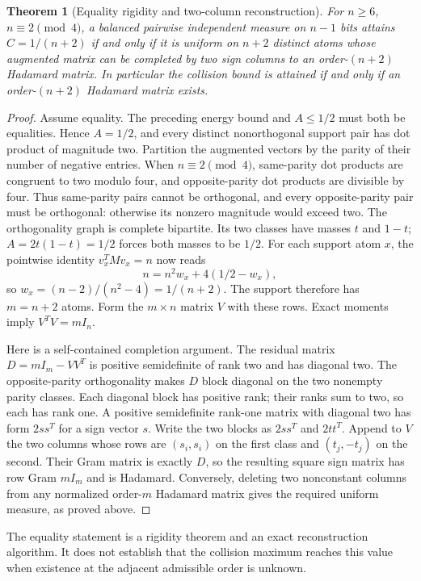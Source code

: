 \documentclass[11pt]{article}
\newtheorem{theorem}{Theorem}[section]
\begin{document}
\begin{theorem}[Equality rigidity and two-column reconstruction]
\label{thm:discrete-parity-equality}
For $n\ge6$, $n\equiv2\pmod4$, a balanced pairwise independent measure
on $n-1$ bits attains $C=1/(n+2)$ if and only if it is uniform on
$n+2$ distinct atoms whose augmented matrix can be completed by two
sign columns to an order-$(n+2)$ Hadamard matrix.
In particular the collision bound is attained if and only if an
order-$(n+2)$ Hadamard matrix exists.
\end{theorem}
\begin{proof}
Assume equality. The preceding energy bound and $A\le1/2$ must
both be equalities. Hence $A=1/2$, and every distinct nonorthogonal
support pair has dot product of magnitude two.
Partition the augmented vectors by the parity of their number of
negative entries. When $n\equiv2\pmod4$, same-parity dot products
are congruent to two modulo four, and opposite-parity dot products
are divisible by four. Thus same-parity pairs cannot be orthogonal,
and every opposite-parity pair must be orthogonal: otherwise its
nonzero magnitude would exceed two. The orthogonality graph is
complete bipartite. Its two classes have masses $t$ and $1-t$;
$A=2t(1-t)=1/2$ forces both masses to be $1/2$.
For each support atom $x$, the pointwise identity $v_x^TMv_x=n$
now reads
\[
 n=n^2w_x+4(1/2-w_x),
\]
so $w_x=(n-2)/(n^2-4)=1/(n+2)$. The support therefore has
$m=n+2$ atoms. Form the $m\times n$ matrix $V$ with these rows.
Exact moments imply $V^TV=mI_n$.

Here is a self-contained completion argument. The residual matrix
$D=mI_m-VV^T$ is positive semidefinite of rank two and has diagonal
two. The opposite-parity orthogonality makes $D$ block diagonal on
the two nonempty parity classes. Each diagonal block has positive
rank; their ranks sum to two, so each has rank one. A positive
semidefinite rank-one matrix with diagonal two has form $2ss^T$
for a sign vector $s$. Write the two blocks as $2ss^T$ and $2tt^T$.
Append to $V$ the two columns whose rows are $(s_i,s_i)$ on the
first class and $(t_j,-t_j)$ on the second. Their Gram matrix is
exactly $D$, so the resulting square sign matrix has row Gram
$mI_m$ and is Hadamard. Conversely, deleting two nonconstant columns
from any normalized order-$m$ Hadamard matrix gives the required
uniform measure, as proved above.
\end{proof}
The equality statement is a rigidity theorem and an exact reconstruction
algorithm. It does not establish that the collision maximum reaches
this value when existence at the adjacent admissible order is unknown.
\end{document}
